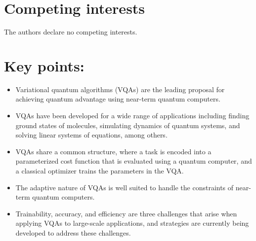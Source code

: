 \documentclass[prx,twocolumn,floatfix,superscriptaddress,longbibliography]{revtex4-1}
\newcommand{\<}{\langle}
\renewcommand{\>}{\rangle}
\begin{document}
\section*{Competing interests}
The authors declare no competing interests.


\section*{Key points:} 
\begin{itemize}
\item Variational quantum algorithms (VQAs) are the leading proposal for achieving quantum advantage using near-term quantum computers.

\item VQAs have been developed for a wide range of applications including finding ground states of molecules, simulating dynamics of quantum systems, and solving linear systems of equations, among others.

\item VQAs share a common structure, where a task is encoded into a parameterized cost function that is evaluated using a quantum computer, and a classical optimizer trains the parameters in the VQA.

\item The adaptive nature of VQAs is well suited to handle the constraints of near-term quantum computers.

\item Trainability, accuracy, and efficiency are three challenges that arise when applying VQAs to large-scale applications, and strategies are currently being developed to address these challenges.
\end{itemize}
\end{document}
